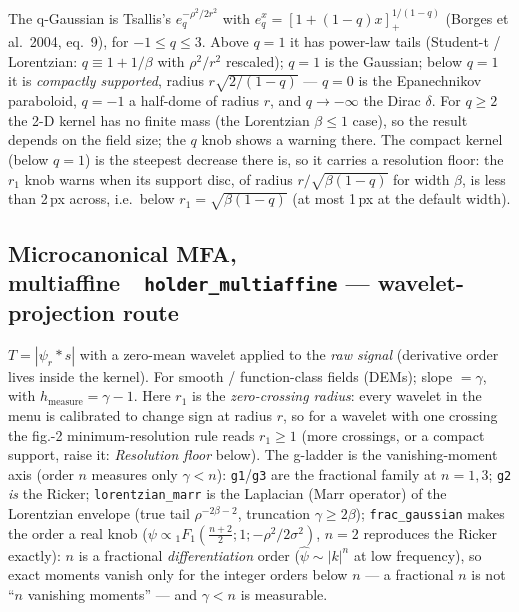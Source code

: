 \documentclass[10pt]{article}
\newcommand{\dev}[1]{\texttt{#1}}
\newcommand{\tool}[2]{#1~\textperiodcentered~\dev{#2}}
\begin{document}
The q-Gaussian is Tsallis's $e_q^{-\rho^2/2r^2}$ with
$e_q^{x}=[1+(1-q)x]_+^{1/(1-q)}$ (Borges et al.\ 2004, eq.~9), for
$-1\le q\le 3$. Above $q=1$ it has power-law tails (Student-t / Lorentzian:
$q\equiv 1+1/\beta$ with $\rho^2/r^2$ rescaled); $q=1$ is the Gaussian; below $q=1$ it is
\emph{compactly supported}, radius $r\sqrt{2/(1-q)}$ --- $q=0$ is the Epanechnikov
paraboloid, $q=-1$ a half-dome of radius $r$, and $q\to-\infty$ the Dirac $\delta$. For
$q\ge2$ the 2-D kernel has no finite mass (the Lorentzian $\beta\le1$ case), so the result
depends on the field size; the $q$ knob shows a warning there. The compact kernel (below $q=1$)
is the steepest decrease there is, so it carries a resolution floor: the $r_1$ knob warns when
its support disc, of radius $r/\sqrt{\beta(1-q)}$ for width $\beta$, is less than 2\,px across,
i.e.\ below $r_1=\sqrt{\beta(1-q)}$ (at most 1\,px at the default width).

\subsection{\tool{Microcanonical MFA, multiaffine}{holder\_multiaffine} --- wavelet-projection route}
$T=|\psi_r * s|$ with a zero-mean wavelet applied to the \emph{raw signal} (derivative
order lives inside the kernel). For smooth / function-class fields (DEMs); slope
$=\gamma$, with $h_{\text{measure}}=\gamma-1$. Here $r_1$ is the \emph{zero-crossing
radius}: every wavelet in the menu is calibrated to change sign at radius $r$, so for a
wavelet with one crossing the fig.-2 minimum-resolution rule reads $r_1\ge 1$ (more crossings,
or a compact support, raise it: \emph{Resolution floor} below). The g-ladder is the
vanishing-moment axis (order $n$ measures only $\gamma<n$): \texttt{g1}/\texttt{g3} are
the fractional family at $n{=}1,3$; \texttt{g2} \emph{is} the Ricker;
\texttt{lorentzian\_marr} is the Laplacian (Marr operator) of the Lorentzian envelope (true
tail $\rho^{-2\beta-2}$, truncation $\gamma\ge 2\beta$); \texttt{frac\_gaussian} makes the
order a real knob ($\psi\propto{}_1F_1(\frac{n+2}{2};1;-\rho^2/2\sigma^2)$, $n{=}2$
reproduces the Ricker exactly): $n$ is a fractional \emph{differentiation} order
($\hat\psi\sim|k|^n$ at low frequency), so exact moments vanish only for the integer orders
below $n$ --- a fractional $n$ is not ``$n$ vanishing moments'' --- and $\gamma<n$ is measurable.
\end{document}
